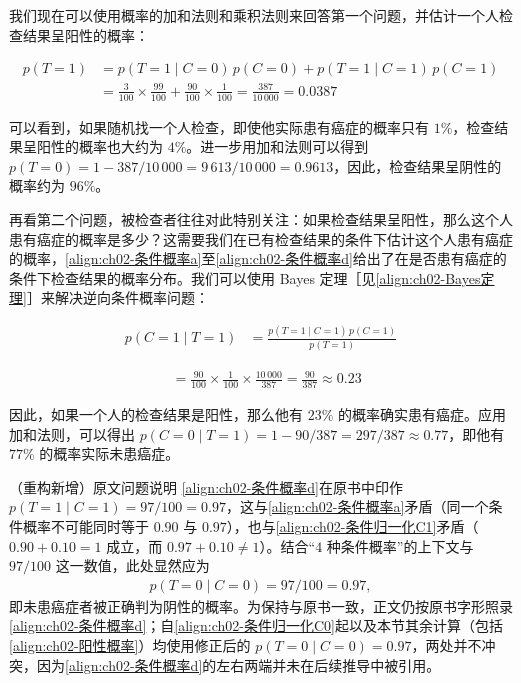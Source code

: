 \documentclass[../../main.tex]{subfiles}
\begin{document}
\begin{example}[ 癌症检查的定量分析]\label{example:ch02-癌症检查定量}
我们现在可以使用概率的加和法则和乘积法则来回答第一个问题，并估计一个人检查结果呈阳性的概率：

\begin{align}
  p(T=1) &= p(T=1\mid C=0)\,p(C=0) + p(T=1\mid C=1)\,p(C=1) \nonumber \\
  &= \frac{3}{100}\times\frac{99}{100} + \frac{90}{100}\times\frac{1}{100} = \frac{387}{10\,000} = 0.0387
  \label{align:ch02-阳性概率}
\end{align}

可以看到，如果随机找一个人检查，即使他实际患有癌症的概率只有 $1\%$，检查结果呈阳性的概率也大约为 $4\%$。进一步用加和法则可以得到 $p(T=0)=1-387/10\,000=9\,613/10\,000=0.9613$，因此，检查结果呈阴性的概率约为 $96\%$。

再看第二个问题，被检查者往往对此特别关注：如果检查结果呈阳性，那么这个人患有癌症的概率是多少？这需要我们在已有检查结果的条件下估计这个人患有癌症的概率，\eqref{align:ch02-条件概率a}至\eqref{align:ch02-条件概率d}给出了在是否患有癌症的条件下检查结果的概率分布。我们可以使用 Bayes 定理［见\eqref{align:ch02-Bayes定理}］来解决逆向条件概率问题：

\begin{align}
  p(C=1\mid T=1) &= \frac{p(T=1\mid C=1)\,p(C=1)}{p(T=1)}
  \label{align:ch02-后验概率公式}
\end{align}

\begin{align}
  &= \frac{90}{100}\times\frac{1}{100}\times\frac{10\,000}{387} = \frac{90}{387} \approx 0.23
  \label{align:ch02-后验概率数值}
\end{align}

因此，如果一个人的检查结果是阳性，那么他有 $23\%$ 的概率确实患有癌症。应用加和法则，可以得出 $p(C=0\mid T=1)=1-90/387=297/387\approx0.77$，即他有 $77\%$ 的概率实际未患癌症。
\end{example}

\begin{remark}（重构新增）原文问题说明
\eqref{align:ch02-条件概率d}在原书中印作 $p(T=1\mid C=1)=97/100=0.97$，这与\eqref{align:ch02-条件概率a}矛盾（同一个条件概率不可能同时等于 $0.90$ 与 $0.97$），也与\eqref{align:ch02-条件归一化C1}矛盾（$0.90+0.10=1$ 成立，而 $0.97+0.10\neq1$）。结合“$4$ 种条件概率”的上下文与 $97/100$ 这一数值，此处显然应为
\begin{align*}
  p(T=0\mid C=0) = 97/100 = 0.97 ,
\end{align*}
即未患癌症者被正确判为阴性的概率。为保持与原书一致，正文仍按原书字形照录\eqref{align:ch02-条件概率d}；自\eqref{align:ch02-条件归一化C0}起以及本节其余计算（包括\eqref{align:ch02-阳性概率}）均使用修正后的 $p(T=0\mid C=0)=0.97$，两处并不冲突，因为\eqref{align:ch02-条件概率d}的左右两端并未在后续推导中被引用。
\end{remark}
\end{document}
